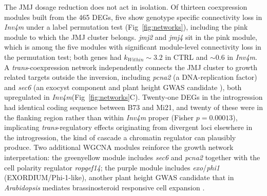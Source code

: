 \documentclass[9pt,twocolumn,twoside]{rilabRxiv}
\newcommand{\invfour}{\textit{Inv4m}\xspace}
\newcommand{\jmjii}{\textit{jmj2}\xspace}
\newcommand{\jmjiv}{\textit{jmj4}\xspace}
\begin{document}
The JMJ dosage reduction does not act in isolation.
Of thirteen coexpression modules built from the 465 DEGs, five show genotype specific connectivity loss in \invfour under a label permutation test (Fig~\ref{fig:networks}), including the pink module to which the JMJ cluster belongs.
\jmjii and \jmjiv sit in the pink module, which is among the five modules with significant module-level connectivity loss in the permutation test; both genes had $k_{Within} \sim 3.2$ in CTRL and $\sim 0.6$ in \invfour.
A \textit{trans}-coexpression network independently connects the JMJ cluster to growth related targets outside the inversion, including \textit{pcna2} (a DNA-replication factor) and \textit{sec6} (an exocyst component and plant height GWAS candidate \citep{peiffer2014}), both upregulated in \invfour (Fig~\ref{fig:networks}C).
Twenty-one DEGs in the introgression had identical coding sequence between B73 and Mi21, and twenty of these were in the flanking region rather than within \invfour proper (Fisher $p = 0.00013$), implicating \textit{trans}-regulatory effects originating from divergent loci elsewhere in the introgression, the kind of cascade a chromatin regulator can plausibly produce.
Two additional WGCNA modules reinforce the growth network interpretation: the greenyellow module includes \textit{sec6} and \textit{pcna2} together with the cell polarity regulator \textit{ropgef14}; the purple module includes \textit{exo}/\textit{phi1} (EXORDIUM/Phi-1-like), another plant height GWAS candidate \citep{liu2023, peiffer2014} that in \textit{Arabidopsis} mediates brassinosteroid responsive cell expansion \citep{farrar2003, collgarcia2004, schroeder2009}.




\end{document}
